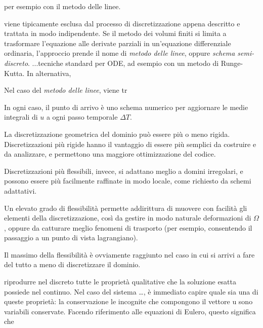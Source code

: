 per esempio con il metodo delle linee.

viene tipicamente esclusa dal processo di discretizzazione appena descritto
e trattata in modo indipendente.
Se il metodo dei volumi finiti si limita a trasformare
l'equazione alle derivate parziali in un'equazione differenziale
ordinaria, l'approccio prende il nome di \emph{metodo delle linee},
oppure \emph{schema semi-discreto}.
...tecniche standard per ODE, ad esempio con un metodo di Runge-Kutta.
In alternativa, 

Nel caso del \emph{metodo delle linee}, 
viene tr


In ogni caso, il punto di arrivo è uno schema numerico
per aggiornare le medie integrali di $u$ a ogni passo temporale $\Delta T$.

\clearpage





La discretizzazione geometrica del dominio può essere più o meno rigida.
Discretizzazioni più rigide hanno il vantaggio di 
essere più semplici da costruire e da analizzare,
e permettono una maggiore ottimizzazione del codice.

Discretizzazioni più flessibili, invece, si adattano
meglio a domini irregolari, e possono essere più facilmente
raffinate in modo locale, come richiesto da schemi adattativi.

Un elevato grado di flessibilità permette addirittura
di muovere con facilità gli elementi della discretizzazione,
così da gestire in modo naturale deformazioni di $\Omega$,
oppure da catturare meglio fenomeni di trasporto
(per esempio, consentendo il passaggio a un punto di vista lagrangiano).

Il massimo della flessibilità è ovviamente raggiunto nel caso
in cui si arrivi a fare del tutto a meno di discretizzare
il dominio.






riprodurre nel discreto tutte le proprietà qualitative che la
soluzione esatta possiede nel continuo.
Nel caso del sistema \dots, è immediato capire quale
sia una di queste proprietà: la conservazione
le incognite che compongono il vettore u sono variabili conservate.
Facendo riferimento alle equazioni di Eulero, questo significa
che 






